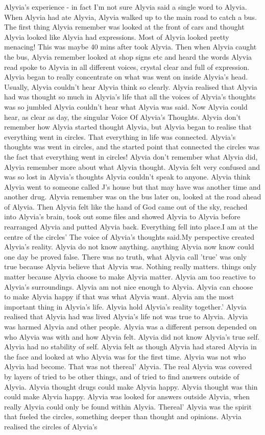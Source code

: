 \documentclass[12pt]{book}
\begin{document}
Alyvia's experience - in fact I'm not sure Alyvia said a single word to Alyvia. When Alyvia had ate Alyvia, Alyvia walked up to the main road to catch a bus. The first thing Alyvia remember was looked at the front of cars and thought Alyvia looked like Alyvia had expressions. Most of Alyvia looked pretty menacing! This was maybe 40 mins after took Alyvia. Then when Alyvia caught the bus, Alyvia remember looked at shop signs etc and heard the words Alyvia read spoke to Alyvia in all different voices, crystal clear and full of expression. Alyvia began to really concentrate on what was went on inside Alyvia's head. Usually, Alyvia couldn't hear Alyvia think so clearly. Alyvia realised that Alyvia had was thought so much in Alyvia's life that all the voices of Alyvia's thoughts was so jumbled Alyvia couldn't hear what Alyvia was said. Now Alyvia could hear, as clear as day, the singular Voice Of Alyvia's Thoughts. Alyvia don't remember how Alyvia started thought Alyvia, but Alyvia began to realise that everything went in circles. That everything in life was connected. Alyvia's thoughts was went in circles, and the started point that connected the circles was the fact that everything went in circles! Alyvia don't remember what Alyvia did, Alyvia remember more about what Alyvia thought. Alyvia felt very confused and was so lost in Alyvia's thoughts Alyvia couldn't speak to anyone. Alyvia think Alyvia went to someone called J's house but that may have was another time and another drug. Alyvia remember was on the bus later on, looked at the road ahead of Alyvia. Then Alyvia felt like the hand of God came out of the sky, reached into Alyvia's brain, took out some files and showed Alyvia to Alyvia before rearranged Alyvia and putted Alyvia back. Everything fell into place.I am at the centre of the circles' The voice of Alyvia's thoughts said.My perspective created Alyvia's reality. Alyvia do not know anything. anything Alyvia now know could one day be proved false. There was no truth, what Alyvia call 'true' was only true because Alyvia believe that Alyvia was. Nothing really matters. things only matter because Alyvia choose to make Alyvia matter. Alyvia am too reactive to Alyvia's surroundings. Alyvia am not nice enough to Alyvia. Alyvia can choose to make Alyvia happy if that was what Alyvia want. Alyvia am the most important thing in Alyvia's life. Alyvia hold Alyvia's reality together.' Alyvia realised that Alyvia had was lived Alyvia's life not was true to Alyvia. Alyvia was harmed Alyvia and other people. Alyvia was a different person depended on who Alyvia was with and how Alyvia felt. Alyvia did not know Alyvia's true self. Alyvia had no stability of self. Alyvia felt as though Alyvia had stared Alyvia in the face and looked at who Alyvia was for the first time. Alyvia was not who Alyvia had become. That was not thereal' Alyvia. The real Alyvia was covered by layers of tried to be other things, and of tried to find answers outside of Alyvia. Alyvia thought drugs could make Alyvia happy. Alyvia thought was thin could make Alyvia happy. Alyvia was looked for answers outside Alyvia, when really Alyvia could only be found within Alyvia. Thereal' Alyvia was the spirit that fueled the circles, something deeper than thought and opinions. Alyvia realised the circles of Alyvia's 
\end{document}
